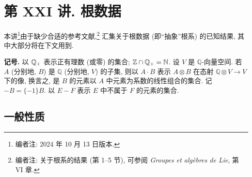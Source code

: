 \chapter*{第 XXI 讲. 根数据}
\noindent
本讲\footnote{编者注: 2024 年 10 月 13 日版本.}由于缺少合适的参考文献,\footnote{编者注: 关于根系的结果 (第 1--5 节), 可参阅 \emph{Groupes et algèbres de Lie}, 第 VI 章.}
汇集关于根数据 (即“抽象”根系) 的已知结果, 其中大部分将在下文用到.

\medskip
\noindent\textbf{记号.}
以 \(\mathbb{Q}_{+}\) 表示正有理数 (或零) 的集合; \(\mathbb Z\cap\mathbb{Q}_{+}=\mathbb N\). 设 \(V\) 是 \(\mathbb Q\)-向量空间. 若 \(A\) (分别地, \(B\)) 是 \(\mathbb Q\) (分别地, \(V\)) 的子集, 则以 \(A\cdot B\) 表示 \(A\otimes B\) 在态射 \(\mathbb Q\otimes V\to V\) 下的像, 换言之, 是 \(B\) 的元素以 \(A\) 中元素为系数的线性组合的集合. 记 \(-B=\{-1\}B\). 以 \(E-F\) 表示 \(E\) 中不属于 \(F\) 的元素的集合.

\section{一般性质}
